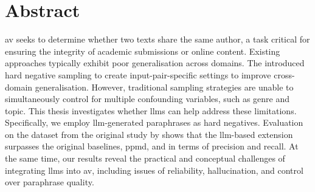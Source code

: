 \chapter*{Abstract}

\Acl{av} seeks to determine whether two texts share the same author, a task critical for ensuring the integrity of academic submissions or online content.
Existing approaches typically exhibit poor generalisation across domains.
The \impAppr{} introduced hard negative sampling to create input-pair-specific settings to improve cross-domain generalisation. 
However, traditional sampling strategies are unable to simultaneously control for multiple confounding variables, such as genre and topic.
This thesis investigates whether \aclp{llm} can help address these limitations. 
Specifically, we employ \acs{llm}-generated paraphrases as hard negatives. 
Evaluation on the \dataStudent{} dataset from the original study by \citet{koppel_determining_2014} shows that the \acs{llm}-based extension surpasses the original baselines, \acs{ppmd}, and \unmasking{} in terms of precision and recall.
At the same time, our results reveal the practical and conceptual challenges of integrating \acsp{llm} into \acl{av}, including issues of reliability, hallucination, and control over paraphrase quality.



